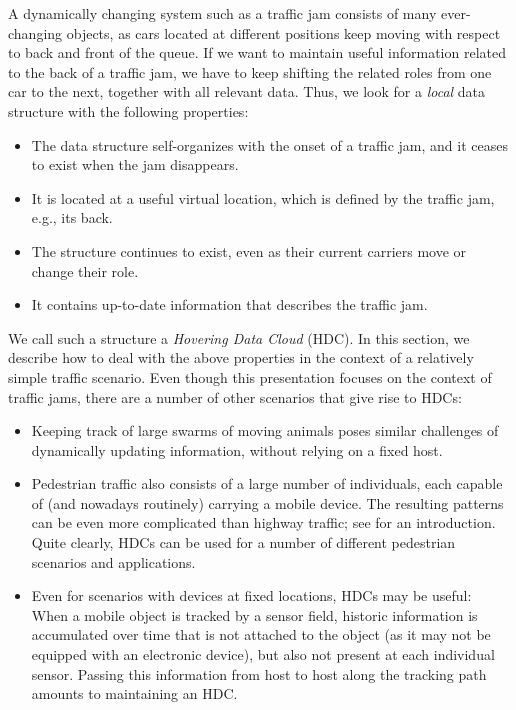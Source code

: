 \documentclass{acmrip}
\begin{document}
A dynamically changing system such as a traffic jam consists of many
ever-changing objects, as cars located at different positions keep
moving with respect to back and front of the queue. If we want to
maintain useful information related to the back of a traffic jam, we
have to keep shifting the related roles from one car to the next,
together with all relevant data. Thus, we look for a {\em local}
data structure with the following properties:

\begin{itemize}
\item The data structure self-organizes with the onset of a traffic
jam, and it ceases to exist when the jam disappears.
\item It is located at a useful virtual location, which
is defined by the traffic jam, e.g., its back.
\item The structure continues to exist, even as their
current carriers move or change their role.
\item It contains up-to-date information that describes the traffic jam.
\end{itemize}

We call such a structure a {\em Hovering Data Cloud} (HDC). In this
section, we describe how to deal with the above properties in the
context of a relatively simple traffic scenario. Even though this presentation
focuses on the context of traffic jams, there are a number of other
scenarios that give rise to HDCs:

\begin{itemize}
\item Keeping track of large swarms of moving animals poses similar
challenges of dynamically updating information, without relying on a
fixed host. \item Pedestrian traffic also consists of a large number of
individuals, each capable of (and nowadays routinely)
carrying a mobile device. The resulting patterns can be even more
complicated than  highway traffic; see \cite{helbing} for
an introduction. Quite clearly, HDCs can be used for a number
of different pedestrian scenarios and applications.
\item Even for scenarios with devices at fixed locations,
HDCs may be useful: When a mobile object is tracked by a sensor
field, historic information is accumulated over time that is not attached
to the object (as it may not be equipped with an electronic device),
but also not present at each individual sensor.
Passing this information from host to host along the tracking path
amounts to maintaining an HDC.
\end{itemize}
\end{document}
